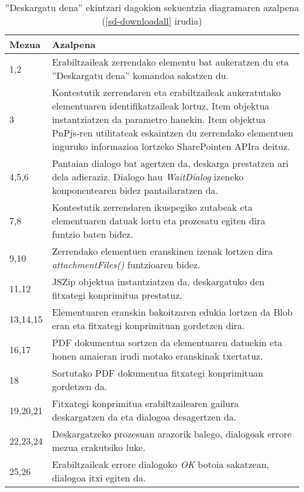 \begin{table}[H]
\vspace{2.5cm}
\centering
{}
\def\arraystretch{1.5}%
\begin{tabular}{ p{1.35cm} p{12.65cm} }
\hline
\textbf{Mezua} & \textbf{Azalpena}\\
\hline
1,2  & Erabiltzaileak zerrendako elementu bat aukeratzen du eta ''Deskargatu dena'' komandoa sakatzen du. \\
3  & Kontestutik zerrendaren eta erabiltzaileak aukeratutako elementuaren identifikatzaileak lortuz, 
     Item objektua instantziatzen da parametro hauekin. Item objektua PnPjs-ren utilitateak eskaintzen du zerrendako
     elementuen inguruko informazioa lortzeko SharePointen APIra deituz. \\
4,5,6  & Pantaian dialogo bat agertzen da, deskarga prestatzen ari dela adieraziz. Dialogo hau \textit{WaitDialog} izeneko konponentearen bidez pantailaratzen da.\\
7,8  & Kontestutik zerrendaren ikuspegiko zutabeak eta elementuaren datuak lortu eta prozesatu egiten dira funtzio baten bidez. \\
9,10  & Zerrendako elementuen eranskinen izenak lortzen dira \textit{attachmentFiles()} funtzioaren bidez.\\
11,12  & JSZip objektua instantziatzen da, deskargatuko den fitxategi konprimitua prestatuz.\\
13,14,15 & Elementuaren eranskin bakoitzaren edukia lortzen da Blob eran eta fitxategi konprimituan gordetzen dira.\\
16,17 & PDF dokumentua sortzen da elementuaren datuekin eta honen amaieran irudi motako eranskinak txertatuz.\\
18 & Sortutako PDF dokumentua fitxategi konprimituan gordetzen da.\\
19,20,21 & Fitxategi konprimitua erabiltzailearen gailura deskargatzen da eta dialogoa desagertzen da.\\
22,23,24 & Deskargatzeko prozesuan arazorik balego, dialogoak errore mezua erakutsiko luke.\\
25,26 & Erabiltzaileak errore dialogoko \textit{OK} botoia sakatzean, dialogoa itxi egiten da.\\
\hline
\end{tabular}
\caption{''Deskargatu dena'' ekintzari dagokion sekuentzia diagramaren azalpena (\ref{sd-downloadall} irudia)}
\label{sd-downloadalltable}
\end{table}


